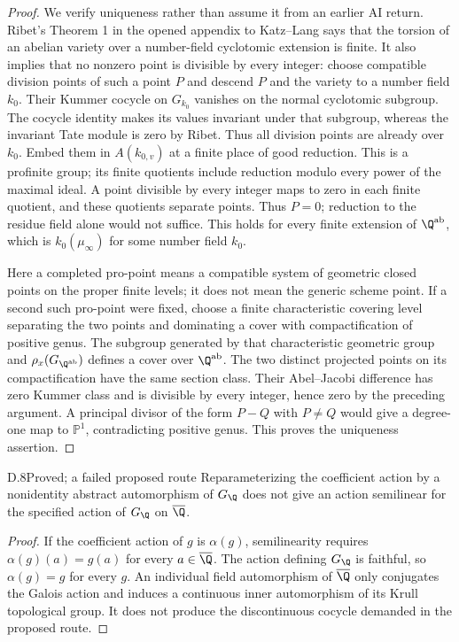 \begin{proof}
We verify uniqueness rather than assume it from an earlier AI
return. Ribet's Theorem 1 in the opened appendix to Katz--Lang
\citep{D_Ribet1981} says that the torsion of an abelian variety over
a number-field cyclotomic extension is finite. It also implies
that no nonzero point is divisible by every integer: choose
compatible division points of such a point $P$ and descend $P$
and the variety to a number field $k_0$. Their Kummer cocycle on
$G_{k_0}$ vanishes on the normal cyclotomic subgroup. The cocycle
identity makes its values invariant under that subgroup, whereas
the invariant Tate module is zero by Ribet. Thus all division
points are already over $k_0$. Embed them in $A(k_{0,v})$ at a
finite place of good reduction. This is a profinite group; its
finite quotients include reduction modulo every power of the
maximal ideal. A point divisible by every integer maps to zero
in each finite quotient, and these quotients separate points.
Thus $P=0$; reduction to the residue field alone would not suffice.
This holds for every finite extension of $\Q^{\mathrm{ab}}$,
which is $k_0(\mu_\infty)$ for some number field $k_0$.

Here a completed pro-point means a compatible system of geometric
closed points on the proper finite levels; it does not mean the
generic scheme point. If a second such pro-point were fixed, choose a finite
characteristic covering level separating the two points and
dominating a cover with compactification of positive genus.
The subgroup generated by that characteristic geometric group
and $\rho_x(G_{\Q^{\mathrm{ab}}})$ defines a cover over
$\Q^{\mathrm{ab}}$. The two distinct projected points on its
compactification have the same section class. Their Abel--Jacobi
difference has zero Kummer class and is divisible by every integer,
hence zero by the preceding argument. A principal divisor of the
form $P-Q$ with $P\ne Q$ would give a degree-one map to
$\mathbb P^1$, contradicting positive genus. This proves the
uniqueness assertion.
\end{proof}

\begin{claim}{D.8}{Proved; a failed proposed route}
Reparameterizing the coefficient action by a nonidentity abstract
automorphism of $G_\Q$ does not give an action semilinear for the
specified action of $G_\Q$ on $\overline\Q$.
\end{claim}
\begin{proof}
If the coefficient action of $g$ is $\alpha(g)$, semilinearity
requires $\alpha(g)(a)=g(a)$ for every $a\in\overline\Q$.
The action defining $G_\Q$ is faithful, so $\alpha(g)=g$ for
every $g$. An individual field automorphism of $\overline\Q$
only conjugates the Galois action and induces a continuous inner
automorphism of its Krull topological group. It does not produce
the discontinuous cocycle demanded in the proposed route.
\end{proof}

